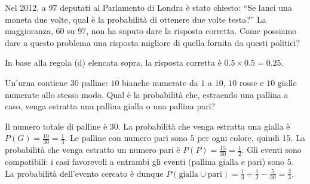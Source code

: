 \begin{exmp}
Nel 2012, a 97 deputati al Parlamento di Londra è stato chiesto: \enquote{Se lanci una moneta due volte, qual è la probabilità di ottenere due volte testa?} La maggioranza, 60 su 97, non ha saputo dare la risposta corretta. Come possiamo dare a questo problema una risposta migliore di quella fornita da questi politici?
\end{exmp}
\begin{solu}
In base alla regola (d) elencata sopra, la risposta corretta è $0.5 \times 0.5 = 0.25$.
\end{solu}

\begin{exmp}
Un'urna contiene $30$ palline: $10$ bianche numerate da $1$ a $10$, $10$ rosse e $10$ gialle numerate allo stesso modo. 
Qual è la probabilità che, estraendo una pallina a caso, venga estratta una pallina gialla o una pallina pari? 
\end{exmp}
\begin{solu}
Il  numero  totale  di  palline  è  $30$.  La  probabilità  che  venga  estratta  una gialla è $P(G) = \frac{10}{30} = \frac{1}{3}$. 
Le palline con numero pari sono $5$ per ogni colore, quindi $15$. 
La probabilità che venga estratto un numero pari è $P(P) = \frac{15}{30} = \frac{1}{2}$. 
Gli eventi sono compatibili: i casi favorevoli a entrambi gli eventi (pallina gialla e pari) sono $5$. 
La probabilità dell'evento cercato è dunque  $P(\text{gialla} \cup \text{pari}) = \frac{1}{3} + \frac{1}{2} - \frac{5}{30} = \frac{2}{3}$.
\end{solu}


